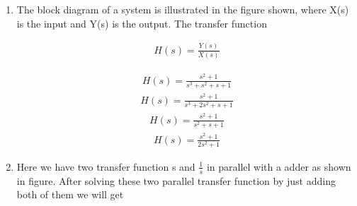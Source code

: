 


%



\begin{enumerate}[label=\thesection.\arabic*.,ref=\thesection.\theenumi]
\item
The block diagram of a system is illustrated in the figure shown, where X(s) is the input and Y(s) is the output. The transfer function

\begin{align}
 H(s)=\frac{Y(s)}{X(s)} 
\end{align}




\begin{align}
 H(s)=\frac{s^2+1}{s^3+s^2+s+1}
\end{align}
\begin{align}
 H(s)=\frac{s^2+1}{s^3+2s^2+s+1}
\end{align}
\begin{align}
 H(s)=\frac{s^2+1}{s^2+s+1}
\end{align}
\begin{align}
 H(s)=\frac{s^2+1}{2s^2+1}
\end{align}



\solution 
\item Here we have two transfer function s and $\frac{1}{s}$ in parallel with a adder as shown in figure.
After solving these two parallel transfer function by just adding both of them we will get


\end{enumerate}
